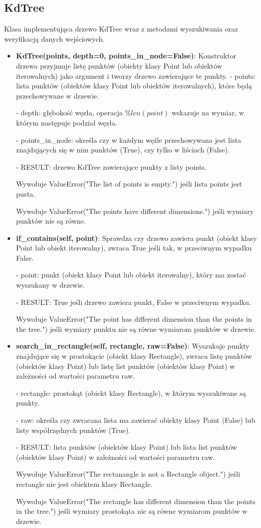 \documentclass{lab}
\begin{document}
\subsection{KdTree}
Klasa implementująca drzewo KdTree wraz z metodami wyszukiwania oraz weryfikacją danych wejściowych.
\begin{itemize}
  \item \textbf{KdTree(points, depth=0, points\_in\_node=False)}:
  Konstruktor drzewa przyjmuje listę punktów (obiekty klasy Point lub obiektów iterowalnych) jako argument i tworzy drzewo zawierające te punkty.
  - points: lista punktów (obiektów klasy Point lub obiektów iterowalnych), które będą przechowywane w drzewie.

  - depth: głębokość węzła, operacja $\%len(point)$ wskazuje na wymiar, w którym następuje podział węzła.

  - points\_in\_node: określa czy w każdym węźle przechowywana jest lista znajdujących się w nim punktów (True), czy tylko w liściach (False).

  - RESULT: drzewo KdTree zawierające punkty z listy points.

  Wywołuje ValueError("The list of points is empty.") jeśli lista points jest pusta.

  Wywołuje ValueError("The points have different dimensions.") jeśli wymiary punktów nie są równe.
  
  \item \textbf{if\_contains(self, point)}:
  Sprawdza czy drzewo zawiera punkt (obiekt klasy Point lub obiekt iterowalny), zwraca True jeśli tak, w przeciwnym wypadku False.

  - point: punkt (obiekt klasy Point lub obiekt iterowalny), który ma zostać wyszukany w drzewie.

  - RESULT: True jeśli drzewo zawiera punkt, False w przeciwnym wypadku.

  Wywołuje ValueError("The point has different dimension than the points in the tree.") jeśli wymiary punktu nie są równe wymiarom punktów w drzewie.

  \item \textbf{search\_in\_rectangle(self, rectangle, raw=False)}:
  Wyszukuje punkty znajdujące się w prostokącie (obiekt klasy Rectangle), zwraca listę punktów (obiektów klasy Point) lub listę list punktów (obiektów klasy Point) w zależności od wartości parametru raw.

  - rectangle: prostokąt (obiekt klasy Rectangle), w którym wyszukiwane są punkty.

  - raw: określa czy zwracana lista ma zawierać obiekty klasy Point (False) lub listy współrzędnych punktów (True).

  - RESULT: lista punktów (obiektów klasy Point) lub lista list punktów (obiektów klasy Point) w zależności od wartości parametru raw.

  Wywołuje ValueError("The rectanangle is not a Rectangle object.") jeśli rectangle nie jest obiektem klasy Rectangle.

  Wywołuje ValueError("The rectangle has different dimension than the points in the tree.") jeśli wymiary prostokąta nie są równe wymiarom punktów w drzewie.
\end{itemize}
\end{document}
